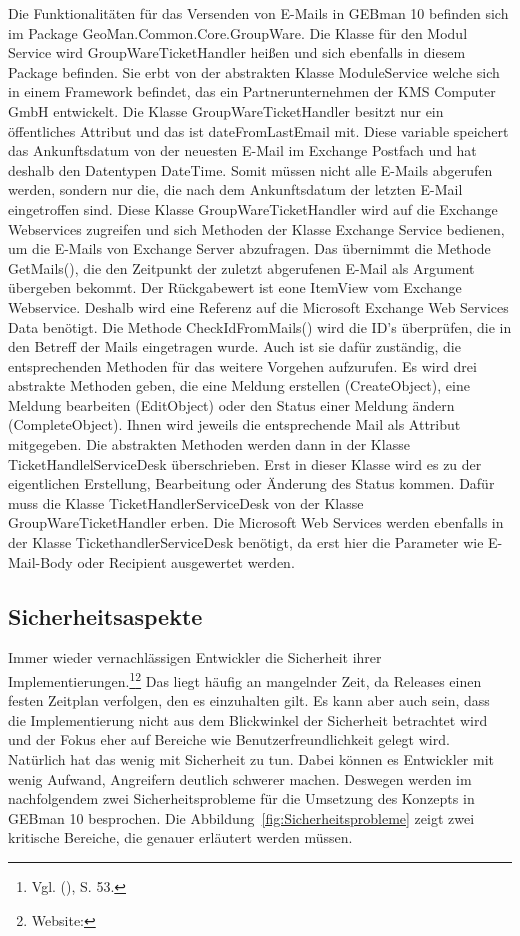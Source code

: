 \noindent
Die Funktionalitäten für das Versenden von E-Mails in GEBman 10 befinden sich im Package GeoMan.Common.Core.GroupWare. Die Klasse für den Modul Service wird GroupWareTicketHandler heißen und sich ebenfalls in diesem Package befinden. Sie erbt von der abstrakten Klasse ModuleService welche sich in einem Framework befindet, das ein Partnerunternehmen der KMS Computer GmbH entwickelt. Die Klasse GroupWareTicketHandler besitzt nur ein öffentliches Attribut und das ist dateFromLastEmail mit. Diese variable speichert das Ankunftsdatum von der neuesten E-Mail im Exchange Postfach und hat deshalb den Datentypen DateTime. Somit müssen nicht alle E-Mails abgerufen werden, sondern nur die, die nach dem Ankunftsdatum der letzten E-Mail eingetroffen sind.\newline
Diese Klasse GroupWareTicketHandler wird auf die Exchange Webservices zugreifen und sich Methoden der Klasse Exchange Service bedienen, um die E-Mails von Exchange Server abzufragen. Das übernimmt die Methode GetMails(), die den Zeitpunkt der zuletzt abgerufenen E-Mail als Argument übergeben bekommt. Der Rückgabewert ist eone ItemView vom Exchange Webservice. Deshalb wird eine Referenz auf die Microsoft Exchange Web Services Data benötigt.
\newline 
Die Methode CheckIdFromMails() wird die ID's überprüfen, die in den Betreff der Mails eingetragen wurde. Auch ist sie dafür zuständig, die entsprechenden Methoden für das weitere Vorgehen aufzurufen. Es wird drei abstrakte Methoden geben, die eine Meldung erstellen (CreateObject), eine Meldung bearbeiten (EditObject) oder den Status einer Meldung ändern (CompleteObject). Ihnen wird jeweils die entsprechende Mail als Attribut mitgegeben. Die abstrakten Methoden werden dann in der Klasse TicketHandlelServiceDesk überschrieben. Erst in dieser Klasse wird es zu der eigentlichen Erstellung, Bearbeitung oder Änderung des Status kommen. Dafür muss die Klasse TicketHandlerServiceDesk von der Klasse GroupWareTicketHandler erben. Die Microsoft Web Services werden ebenfalls in der Klasse TickethandlerServiceDesk benötigt, da erst hier die Parameter wie E-Mail-Body oder Recipient ausgewertet werden.\\


\subsection{Sicherheitsaspekte}
\noindent
Immer wieder vernachlässigen Entwickler die Sicherheit ihrer Implementierungen.\footnote{Vgl. \citeauthor{Ziegler} (\citeyear{Ziegler}), S. 53.}\footnote{Website:\cite{Sicherheit1}} Das liegt häufig an mangelnder Zeit, da Releases einen festen Zeitplan verfolgen, den es einzuhalten gilt. Es kann aber auch sein, dass die Implementierung nicht aus dem Blickwinkel der Sicherheit betrachtet wird und der Fokus eher auf Bereiche wie Benutzerfreundlichkeit gelegt wird. Natürlich hat das wenig mit Sicherheit zu tun. Dabei können es Entwickler mit wenig Aufwand, Angreifern deutlich schwerer machen. Deswegen werden im nachfolgendem zwei Sicherheitsprobleme für die Umsetzung des Konzepts in GEBman 10 besprochen. Die Abbildung~\ref{fig:Sicherheitsprobleme} zeigt zwei kritische Bereiche, die genauer erläutert werden müssen.

